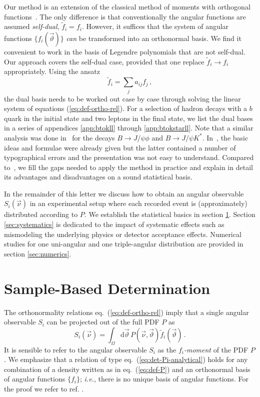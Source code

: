 \documentclass[aps,nofootinbib,preprintnumbers,prd,twocolumn]{revtex4-1}
\newcommand{\dual}[1]{\tilde{#1}}
\newcommand{\ie}{\textit{i.e.}}
\newcommand{\nuvec}{\vec{\nu}}
\newcommand{\refeq}[1]{eq.~(\ref{eq:#1})}
\newcommand{\rmdx}[1]{\mbox{d} #1 \,} %
\newcommand{\thvec}{\vec{\vartheta}}
\renewcommand{\theta}{\vartheta}
\begin{document}
Our method is an extension of the classical method of moments with
orthogonal functions~\cite[sec. 8.2]{James:2006zz}. The only difference
is that conventionally the angular functions are assumed
\emph{self-dual}, $\dual{f}_i = f_i$. However, it suffices that the
system of angular functions $\{f_i(\thvec)\}$ \emph{can} be transformed into
an orthonormal basis. We find it convenient to work
in the basis of Legendre polynomials that are not self-dual.
Our approach covers the self-dual case, provided that one
replace $\dual{f}_i \to f_i$ appropriately.
Using the ansatz
\begin{equation}
  \label{eq:dual-ansatz}
  \dual{f}_i = \sum_{j} a_{ij} f_j \,,
\end{equation}
the dual basis needs to be worked out case by case through solving the
linear system of equations (\ref{eq:def-ortho-rel}). For a selection
of hadron decays with a $b$ quark in the initial state and two leptons
in the final state, we list the dual bases in a series of appendices
\ref{app:btokll} through \ref{app:btokstarll}. Note that a similar
analysis was done in~\cite{Dighe:1998vk} for the decays $B \to J/\psi
\phi$ and $B \to J/\psi K^{*}$. In~\cite[section X]{Chung:1997qd}, the
basic ideas and formulae were already given but the latter contained a
number of typographical errors and the presentation was not easy to
understand. Compared to~\cite{Chung:1997qd}, we fill the gaps needed
to apply the method in practice and explain in detail its advantages
and disadvantages on a sound statistical basis.

In the remainder of this letter we discuss how to obtain an angular
observable $S_i(\nuvec)$ in an experimental setup where each recorded
event is (approximately) distributed according to $P$.  We establish
the statistical basics in section \ref{sec:sample-based-det}. Section
\ref{sec:systematics} is dedicated to the impact of systematic effects
such as mismodeling the underlying physics or detector acceptance
effects. Numerical studies for one uni-angular and one triple-angular
distribution are provided in section \ref{sec:numerics}.

\section{Sample-Based Determination}
\label{sec:sample-based-det}

The orthonormality relations \refeq{def-ortho-rel} imply that a single angular observable $S_i$
can be projected out of the full PDF $P$ as
\begin{equation}
    \label{eq:det-Pi-analytical}
    S_i(\nuvec) = \int_{\Omega} \rmdx{\vec\theta}  P(\nuvec, \thvec) \dual{f}_i(\thvec)\,.
\end{equation}
It is sensible to refer to the angular observable $S_i$ as the
\emph{$f_i$-moment} of the PDF $P$.  We emphasize that a relation of
type \refeq{det-Pi-analytical} holds for any combination of a density
written as in \refeq{def-P} and an orthonormal basis of angular
functions $\lbrace f_i \rbrace$; \ie, there is no unique
basis of angular functions. For the proof we refer to ref. \cite{Dighe:1998vk}.\\
\end{document}
